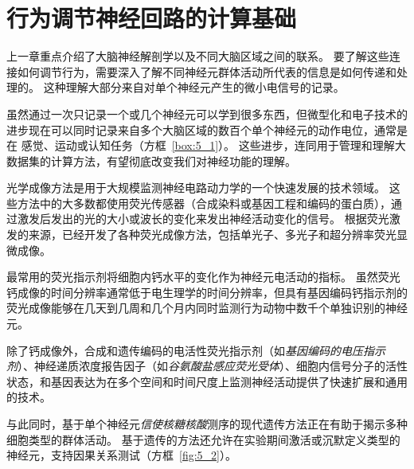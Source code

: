 \chapter{行为调节神经回路的计算基础} \label{chap:chap5}

上一章重点介绍了大脑神经解剖学以及不同大脑区域之间的联系。
要了解这些连接如何调节行为，需要深入了解不同神经元群体活动所代表的信息是如何传递和处理的。
这种理解大部分来自对单个神经元产生的微小电信号的记录。


虽然通过一次只记录一个或几个神经元可以学到很多东西，但微型化和电子技术的进步现在可以同时记录来自多个大脑区域的数百个单个神经元的动作电位，通常是在 感觉、运动或认知任务（方框~\ref{box:5_1}）。 
这些进步，连同用于管理和理解大数据集的计算方法，有望彻底改变我们对神经功能的理解。


\begin{proposition}[光学神经成像] \label{box:5_1}
	
	\quad \quad 光学成像方法是用于大规模监测神经电路动力学的一个快速发展的技术领域。
	这些方法中的大多数都使用荧光传感器（合成染料或基因工程和编码的蛋白质），通过激发后发出的光的大小或波长的变化来发出神经活动变化的信号。
	根据荧光激发的来源，已经开发了各种荧光成像方法，包括单光子、多光子和超分辨率荧光显微成像。
	
	\quad \quad 最常用的荧光指示剂将细胞内钙水平的变化作为神经元电活动的指标。
	虽然荧光钙成像的时间分辨率通常低于电生理学的时间分辨率，但具有基因编码钙指示剂的荧光成像能够在几天到几周和几个月内同时监测行为动物中数千个单独识别的神经元。
	
	\quad \quad 除了钙成像外，合成和遗传编码的电活性荧光指示剂（如\textit{基因编码的电压指示剂}）、神经递质浓度报告因子（如\textit{谷氨酸盐感应荧光受体}）、细胞内信号分子的活性状态，和基因表达为在多个空间和时间尺度上监测神经活动提供了快速扩展和通用的技术。
	
\end{proposition}


与此同时，基于单个神经元\textit{信使核糖核酸}测序的现代遗传方法正在有助于揭示多种细胞类型的群体活动。
基于遗传的方法还允许在实验期间激活或沉默定义类型的神经元，支持因果关系测试（方框~\ref{fig:5_2}）。


